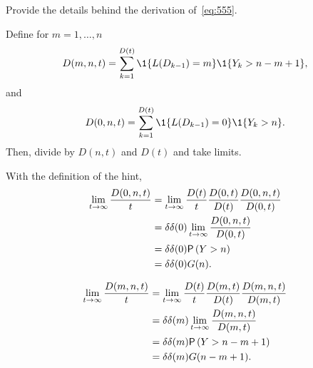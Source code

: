 \begin{exercise}
 Provide the details behind the derivation of~\cref{eq:555}.
\begin{hint}
Define for $m=1,\ldots, n$
\begin{equation*}
 D(m, n, t) = \sum_{k=1}^{D(t)}\1{L(D_{k-1})=m}\1{Y_k>n-m+1},
\end{equation*}
and 
\begin{equation*}
 D(0, n, t) = \sum_{k=1}^{D(t)}\1{L(D_{k-1})=0}\1{Y_k>n}.
\end{equation*}
Then, divide by $D(n,t)$ and $D(t)$ and take limits.
\end{hint}
\begin{solution}
With the definition of the hint, 
\begin{align*}
 \lim_{t\to\infty} \frac{ D(0, n, t)}t 
&= \lim_{t\to\infty} \frac{D(t)}t \frac{D(0, t)}{D(t)}\frac{ D(0, n, t)}{D(0,t)} \\
&= \delta \delta(0) \lim_{t\to\infty} \frac{ D(0, n, t)}{D(0,t)} \\
&= \delta \delta(0) \P{Y>n}\\
& = \delta \delta(0) G(n).
\end{align*}

\begin{align*}
 \lim_{t\to\infty} \frac{ D(m, n, t)}t 
&= \lim_{t\to\infty} \frac{D(t)}t \frac{D(m, t)}{D(t)}\frac{ D(m, n, t)}{D(m,t)} \\
&= \delta \delta(m) \lim_{t\to\infty} \frac{ D(m, n, t)}{D(m,t)} \\
&= \delta \delta(m) \P{Y>n-m+1}\\
& = \delta \delta(m) G(n-m+1).
\end{align*}
\end{solution}
\end{exercise}



